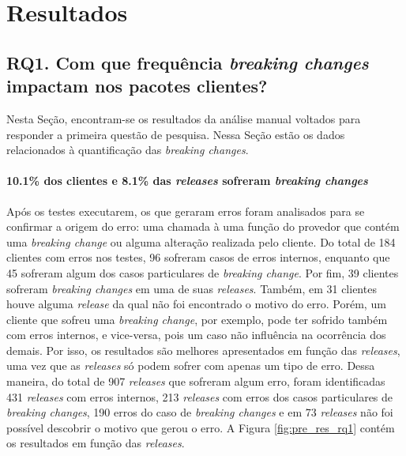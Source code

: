 \chapter{Resultados}
\label{cap:results}

\section{RQ1. Com que frequência \textit{breaking changes} impactam nos pacotes clientes?}

Nesta Seção, encontram-se os resultados da análise manual voltados para responder a primeira questão de pesquisa. Nessa Seção estão os dados relacionados à quantificação das \textit{breaking changes}.

\subsubsection{\textbf{10.1\% dos clientes e 8.1\% das \textit{releases} sofreram \textit{breaking changes}}}

Após os testes executarem, os que geraram erros foram analisados para se confirmar a origem do erro: uma chamada à uma função do provedor que contém uma \textit{breaking change} ou alguma alteração realizada pelo cliente. Do total de 184 clientes com erros nos testes, 96 sofreram casos de erros internos, enquanto que 45 sofreram algum dos casos particulares de \textit{breaking change}. Por fim, 39 clientes sofreram \textit{breaking changes} em uma de suas \textit{releases}. Também, em 31 clientes houve alguma \textit{release} da qual não foi encontrado o motivo do erro. Porém, um cliente que sofreu uma \textit{breaking change}, por exemplo, pode ter sofrido também com erros internos, e vice-versa, pois um caso não influência na ocorrência dos demais. Por isso, os resultados são melhores apresentados em função das \textit{releases}, uma vez que as \textit{releases} só podem sofrer com apenas um tipo de erro. Dessa maneira, do total de 907 \textit{releases} que sofreram algum erro, foram identificadas 431 \textit{releases} com erros internos, 213 \textit{releases} com erros dos casos particulares de \textit{breaking changes}, 190 erros do caso de \textit{breaking changes} e em 73 \textit{releases} não foi possível descobrir o motivo que gerou o erro. A Figura \ref{fig:pre_res_rq1} contém os resultados em função das \textit{releases}.

